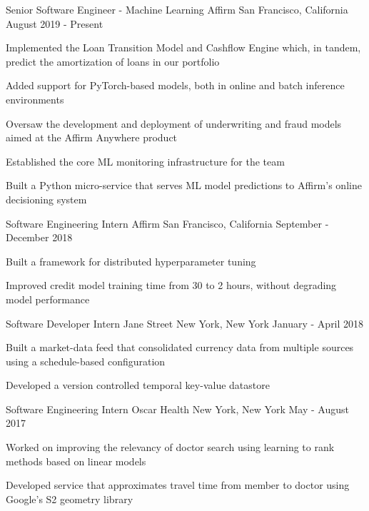 \begin{cventries}
  \cventry
    {Senior Software Engineer - Machine Learning}
    {Affirm}
    {San Francisco, California}
    {August 2019 - Present}
    {
      \begin{cvitems}
      \item Implemented the Loan Transition Model and Cashflow Engine which, in tandem, predict the amortization of loans in our portfolio
      \item Added support for PyTorch-based models, both in online and batch inference environments
      \item Oversaw the development and deployment of underwriting and fraud models aimed at the Affirm Anywhere product
      \item Established the core ML monitoring infrastructure for the team
      \item Built a Python micro-service that serves ML model predictions to Affirm's online decisioning system
      \end{cvitems}
    }
  \cventry
    {Software Engineering Intern}
    {Affirm}
    {San Francisco, California}
    {September - December 2018}
    {
      \begin{cvitems}
      \item Built a framework for distributed hyperparameter tuning
      \item Improved credit model training time from 30 to 2 hours, without degrading model performance
      \end{cvitems}
    }
  \cventry
    {Software Developer Intern}
    {Jane Street}
    {New York, New York}
    {January - April 2018}
    {
      \begin{cvitems}
      \item Built a market-data feed that consolidated currency data from multiple sources using a schedule-based configuration
      \item Developed a version controlled temporal key-value datastore
      \end{cvitems}
    }
  \cventry
    {Software Engineering Intern}
    {Oscar Health}
    {New York, New York}
    {May - August 2017}
    {
      \begin{cvitems}
      \item Worked on improving the relevancy of doctor search using learning to rank methods based on linear models
      \item Developed service that approximates travel time from member to doctor using Google's S2 geometry library

\end{cvitems}}
\end{cventries}
